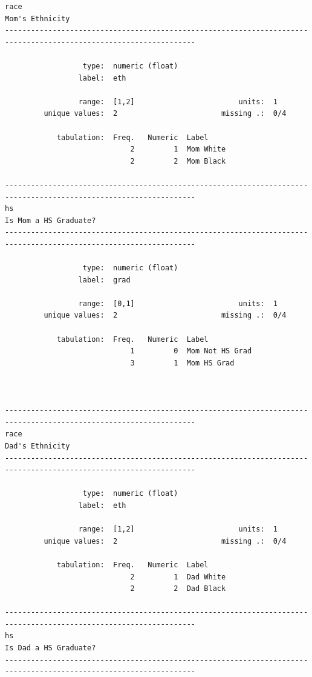 \documentclass[
]{book}
\begin{document}
\begin{verbatim}
race                                                                                               Mom's Ethnicity
------------------------------------------------------------------------------------------------------------------

                  type:  numeric (float)
                 label:  eth

                 range:  [1,2]                        units:  1
         unique values:  2                        missing .:  0/4

            tabulation:  Freq.   Numeric  Label
                             2         1  Mom White
                             2         2  Mom Black

------------------------------------------------------------------------------------------------------------------
hs                                                                                           Is Mom a HS Graduate?
------------------------------------------------------------------------------------------------------------------

                  type:  numeric (float)
                 label:  grad

                 range:  [0,1]                        units:  1
         unique values:  2                        missing .:  0/4

            tabulation:  Freq.   Numeric  Label
                             1         0  Mom Not HS Grad
                             3         1  Mom HS Grad



------------------------------------------------------------------------------------------------------------------
race                                                                                               Dad's Ethnicity
------------------------------------------------------------------------------------------------------------------

                  type:  numeric (float)
                 label:  eth

                 range:  [1,2]                        units:  1
         unique values:  2                        missing .:  0/4

            tabulation:  Freq.   Numeric  Label
                             2         1  Dad White
                             2         2  Dad Black

------------------------------------------------------------------------------------------------------------------
hs                                                                                           Is Dad a HS Graduate?
------------------------------------------------------------------------------------------------------------------


\end{verbatim}
\end{document}
